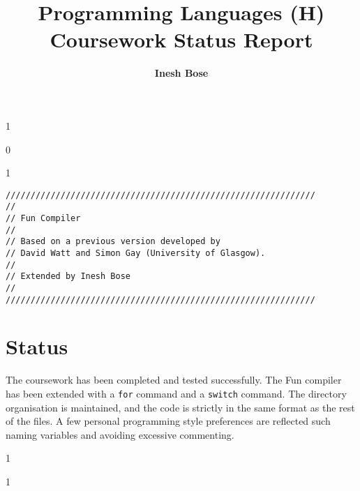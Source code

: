 \documentclass{article}
\title{Programming Languages (H)\\Coursework Status Report}
\author{\bf Inesh Bose}
\date{}
\newcommand{\code}[1]{\texttt{#1}}
\newenvironment{codelst}{\captionsetup{type=listing}}{}
\newcommand{\showtoc}{0}
\newcommand{\showinstructions}{1}
\newcommand{\dividestages}{0}
\begin{document}

\maketitle

\if\showtoc1

    \vspace{2cm}

    \if\dividestages0
        \vspace{2cm}
    \fi

    \tableofcontents

\fi




\if\showtoc1

\newpage

\begin{codelst}
\begin{verbatim}
//////////////////////////////////////////////////////////////
//
// Fun Compiler
//
// Based on a previous version developed by
// David Watt and Simon Gay (University of Glasgow).
//
// Extended by Inesh Bose
//
//////////////////////////////////////////////////////////////
\end{verbatim}
\end{codelst}

\fi

\vspace{0.5cm}

\section{Status}

\noindent The coursework has been completed and tested successfully. The Fun compiler has been extended with a \code{for} command and a \code{switch} command. The directory organisation is maintained, and the code is strictly in the same format as the rest of the files. A few personal programming style preferences are reflected such naming variables and avoiding excessive commenting.

\if\showinstructions1

\vspace{0.5cm}

\if\showtoc1
\vspace{0.5cm}
\fi
\end{document}
